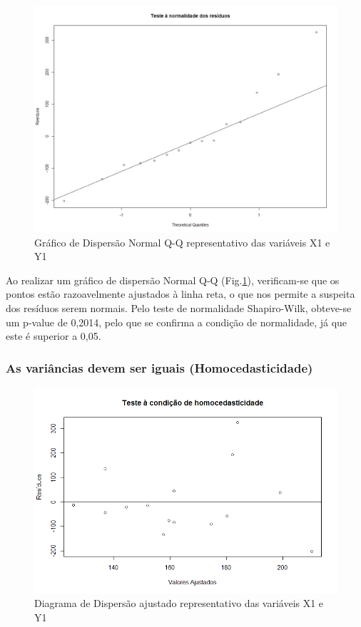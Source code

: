 \documentclass[conference]{IEEEtran}
\begin{document}
\begin{figure}[htbp]
\centerline{\includegraphics[width=0.95\columnwidth]{images/03.a.3.png}}
\caption{Gráfico de Dispersão Normal Q-Q representativo das variáveis X1 e Y1}
\label{3a3}
\end{figure}

Ao realizar um gráfico de dispersão Normal Q-Q (Fig.\ref{3a3}), verificam-se que os pontos estão razoavelmente ajustados à linha reta, o que nos permite a suspeita dos resíduos serem normais. Pelo teste de normalidade Shapiro-Wilk, obteve-se um p-value de 0,2014, pelo que se confirma a condição de normalidade, já que este é superior a 0,05.

\subsubsection{As variâncias devem ser iguais (Homocedasticidade)}

\begin{figure}[htbp]
\centerline{\includegraphics[width=0.95\columnwidth]{images/03.a.4.png}}
\caption{Diagrama de Dispersão ajustado representativo das variáveis X1 e Y1}
\label{3a4}
\end{figure}
\end{document}
